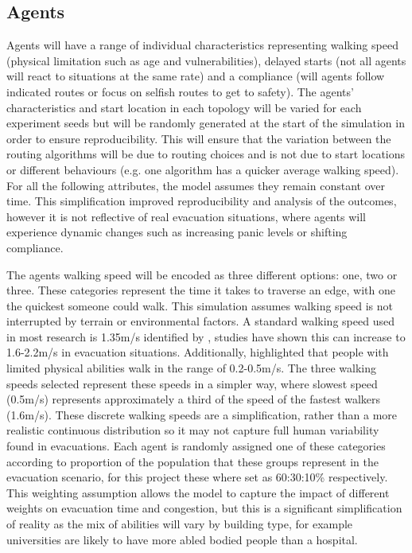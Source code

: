 \documentclass[12pt,a4paper]{report}
\begin{document}
\subsection{Agents}
Agents will have a range of individual characteristics representing walking speed (physical limitation such as age and vulnerabilities), delayed starts (not all agents will react to situations at the same rate) and a compliance (will agents follow indicated routes or focus on selfish routes to get to safety). The agents’ characteristics and start location in each topology will be varied for each experiment seeds but will be randomly generated at the start of the simulation in order to ensure reproducibility. This will ensure that the variation between the routing algorithms will be due to routing choices and is not due to start locations or different behaviours (e.g. one algorithm has a quicker average walking speed). For all the following attributes, the model assumes they remain constant over time. This simplification improved reproducibility and analysis of the outcomes, however it is not reflective of real evacuation situations, where agents will experience dynamic changes such as increasing panic levels or shifting compliance.

The agents walking speed will be encoded as three different options: one, two or three. These categories represent the time it takes to traverse an edge, with one the quickest someone could walk. This simulation assumes walking speed is not interrupted by terrain or environmental factors. A standard walking speed used in most research is 1.35m/s identified by \cite{FRUIN_1970_WALKING}, studies have shown this can increase to 1.6-2.2m/s \citep{Zhao} in evacuation situations. Additionally, \cite{GOV_UK_2025_WALKING} highlighted that people with limited physical abilities walk in the range of 0.2-0.5m/s. The three walking speeds selected represent these speeds in a simpler way, where slowest speed (0.5m/s) represents approximately a third of the speed of the fastest walkers (1.6m/s). These discrete walking speeds are a simplification, rather than a more realistic continuous distribution so it may not capture full human variability found in evacuations. Each agent is randomly assigned one of these categories according to proportion of the population that these groups represent in the evacuation scenario, for this project these where set as 60:30:10\% respectively. This weighting assumption allows the model to capture the impact of different weights on evacuation time and congestion, but this is a significant simplification of reality as the mix of abilities will vary by building type, for example universities are likely to have more abled bodied people than a hospital.
\end{document}
